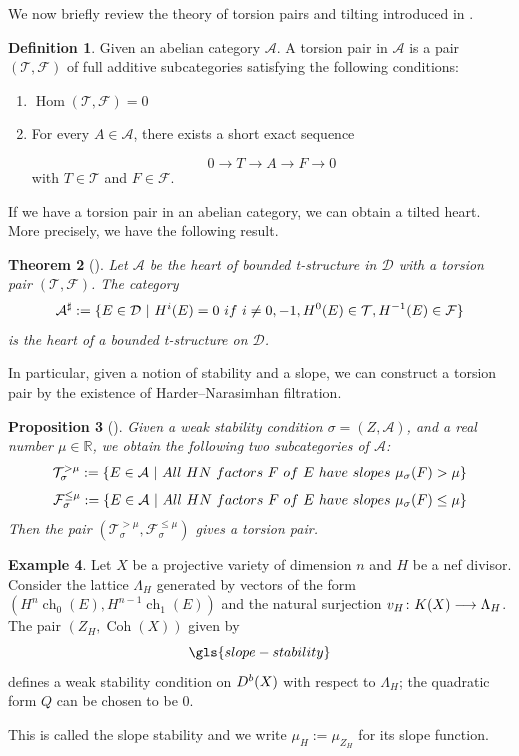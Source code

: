\documentclass[12pt]{amsart}
\newtheorem{theorem}{Theorem}[section]
\newtheorem{proposition}[theorem]{Proposition}
\theoremstyle{definition}
\newtheorem{definition}[theorem]{Definition}
\newtheorem{example}[theorem]{Example}
\DeclareMathOperator{\Hom}{Hom}
\DeclareMathOperator{\Coh}{Coh}
\DeclareMathOperator{\ch}{ch}
\begin{document}
We now briefly review the theory of torsion pairs and tilting introduced in \cite{HRS96}.



\begin{definition} 
Given an abelian category $\mathcal{A}$. A torsion pair in $\mathcal{A}$ is a pair $(\mathcal{T} , \mathcal{F})$ of full additive subcategories satisfying the following conditions:
\begin{enumerate}
    \item[(1)] $\Hom(\mathcal{T} , \mathcal{F})  = 0$
    \item[(2)] For every $A \in \mathcal{A}$, there exists a short exact sequence
    
$$ 0 \longrightarrow T \longrightarrow  A \longrightarrow  F \longrightarrow 0$$
with $ T \in \mathcal{T}$ and $F \in \mathcal{F}$.
\end{enumerate}
\end{definition}

If we have a torsion pair in an abelian category, we can obtain a tilted heart. 
More precisely, we have the following result.
\begin{theorem}[{\normalfont\cite{HRS96}}]\label{HRStilt}
Let $\mathcal{A}$ be the heart of bounded t-structure in $\mathcal{D}$ with a torsion pair $(\mathcal{T}, \mathcal{F})$. 
The category
$$\mathcal{A}^\sharp := \{ E \in \mathcal{D} \ | \ H^i(E) = 0 \ {\rm if} \ i \neq 0, -1, H^0(E) \in \mathcal{T} , H^{-1}(E) \in  \mathcal{F} \}$$ 
is the heart of a bounded t-structure on $\mathcal{D}$.
\end{theorem}

In particular, given a notion of stability and a slope, we can construct a torsion pair by the existence of Harder--Narasimhan filtration.
\begin{proposition}[{\normalfont\cite{HRS96}}]\label{HRS}
Given a weak stability condition $\sigma = (Z,\mathcal{A})$, and a real number $\mu \in \mathbb{R}$, we obtain the following two subcategories of $\mathcal{A}$:
$$ \mathcal{T}^{>\mu}_\sigma := \{E \in \mathcal{A} \ | \ {\rm All \ HN \ factors} \  F \  {\rm of} \ E \ {\rm have \ slopes} \ \mu_\sigma(F) > \mu \} $$
$$\mathcal{F}^{\leq\mu}_\sigma := \{E \in \mathcal{A} \ | \ {\rm All \ HN \ factors} \  F \  {\rm of} \ E \ {\rm have \ slopes} \ \mu_\sigma(F) \leq \mu \}$$
Then the pair $(\mathcal{T}^{>\mu}_\sigma,\mathcal{F}^{\leq \mu}_\sigma)$ gives a torsion pair.
\end{proposition}

\begin{example}

Let $X$ be a projective variety of dimension $n$ and $H$ be a nef divisor. 
Consider the lattice $\Lambda_H$ generated by vectors of the form $(H^{n} \ch_0(E), H^{n-1} \ch_1(E))$ and the natural surjection $v_H \colon {\rm K}(X) \longrightarrow \Lambda_H$.
The pair $(Z_H,\Coh(X))$ given by 
\[ \gls{slope-stability}\]
defines a weak stability condition on ${\rm D}^b(X)$ with respect to $\Lambda_H$; the quadratic form $Q$ can be chosen to be $0$.

This is called the slope stability and we write $\mu_H := \mu_{Z_H} $ for its slope function.
\end{example}
\end{document}
